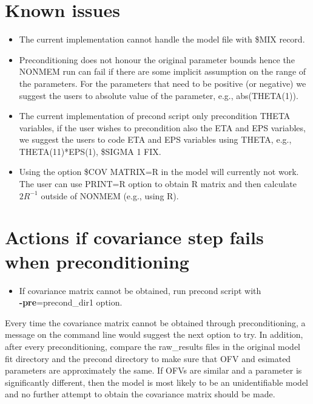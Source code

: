 \section{Known issues}

\begin{itemize}
    \item The current implementation cannot handle the model file with \$MIX record.

    \item Preconditioning does not honour the original parameter bounds hence the NONMEM run can fail if there are some implicit assumption on the range of the parameters.  For the parameters that need to be positive (or negative) we suggest the users to absolute value of the parameter, e.g., abs(THETA(1)).

    \item The current implementation of precond script only precondition THETA variables, if the user wishes to precondition also the ETA and EPS variables, we suggest the users to code ETA and EPS variables using THETA, e.g., THETA(11)*EPS(1), \$SIGMA 1 FIX.

    \item Using the option \$COV MATRIX=R in the model will currently not work.  The user can use PRINT=R option to obtain R matrix and then calculate $2R^{-1}$ outside of NONMEM (e.g., using R).
\end{itemize}

\section{Actions if covariance step fails when preconditioning}

\begin{itemize}
\item If covariance matrix cannot be obtained, run precond script with \\ \mbox{{\bf -pre}}=precond\_dir1 option.
\end{itemize}

Every time the covariance matrix cannot be obtained through preconditioning, a message on the command line would suggest the next option to try.  In addition, after every preconditioning, compare the raw\_results files in the original model fit directory and the precond directory to make sure that OFV and esimated parameters are approximately the same.  If OFVs are similar and a parameter is significantly different, then the model is most likely to be an unidentifiable model and no further attempt to obtain the covariance matrix should be made.


